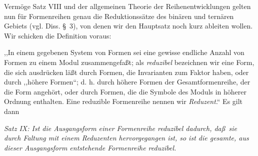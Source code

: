 Verm\"oge Satz VIII und der allgemeinen Theorie der Reihenentwicklungen gelten nun f\"ur Formenreihen genau die Reduktionss\"atze des bin\"aren und tern\"aren Gebiets (vgl. Diss. \S\ 3), von denen wir den Hauptsatz noch kurz ableiten wollen. Wir schicken die Definition voraus:

,,In einem gegebenen System von Formen sei eine gewisse endliche Anzahl von Formen zu einem Modul zusammengefa\ss t; als \emph{reduzibel} bezeichnen wir eine Form, die sich ausdr\"ucken l\"a\ss t durch Formen, die Invarianten zum Faktor haben, oder durch ,,h\"ohere Formen``; d. h. durch h\"ohere Formen der Gesamtformenreihe, der die Form angeh\"ort, oder durch Formen, die die Symbole des Moduls in h\"oherer Ordnung enthalten. Eine reduzible Formenreihe nennen wir \emph{Reduzent}.`` Es gilt dann

\emph{Satz IX: Ist die Ausgangsform einer Formenreihe reduzibel dadurch, da\ss\ sie durch Faltung mit einem Reduzenten hervorgegangen ist, so ist die gesamte, aus dieser Ausgangsform entstehende Formenreihe reduzibel.}
